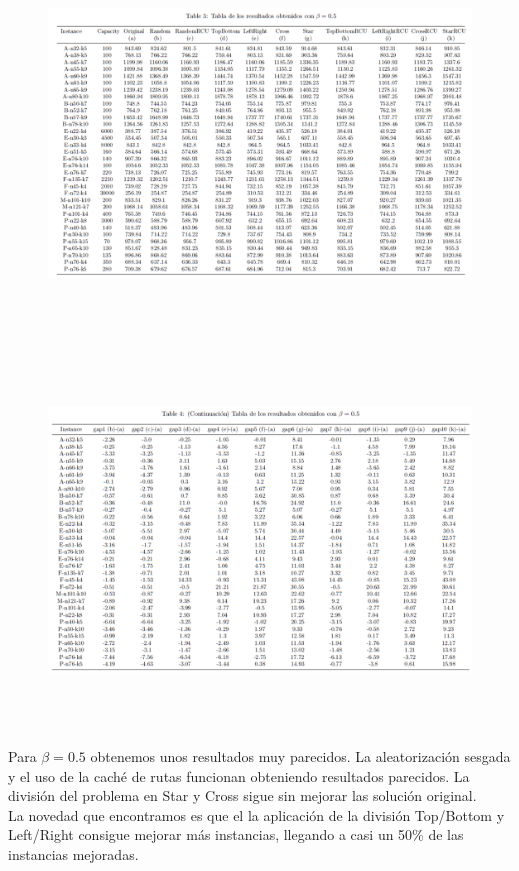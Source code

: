 \documentclass[11pt]{article} %
\begin{document}
\begin{enumerate}
\begin{figure}[H]
\centering
\includegraphics[width=\linewidth, height=10cm]{table051.png} 
\end{figure}
\begin{figure}[H]
\includegraphics[width=\linewidth, height=10cm]{table052.png} 
\label{fig:subim1}
\end{figure}

Para $\beta = 0.5$ obtenemos unos resultados muy parecidos. La aleatorización sesgada y el uso de la caché de rutas funcionan obteniendo resultados parecidos. La división del problema en Star y Cross sigue sin mejorar las solución original. \\
La novedad que encontramos es que el la aplicación de la división Top/Bottom y Left/Right consigue mejorar más instancias, llegando a casi un 50\% de las instancias mejoradas.\\


\end{enumerate}
\end{document}
